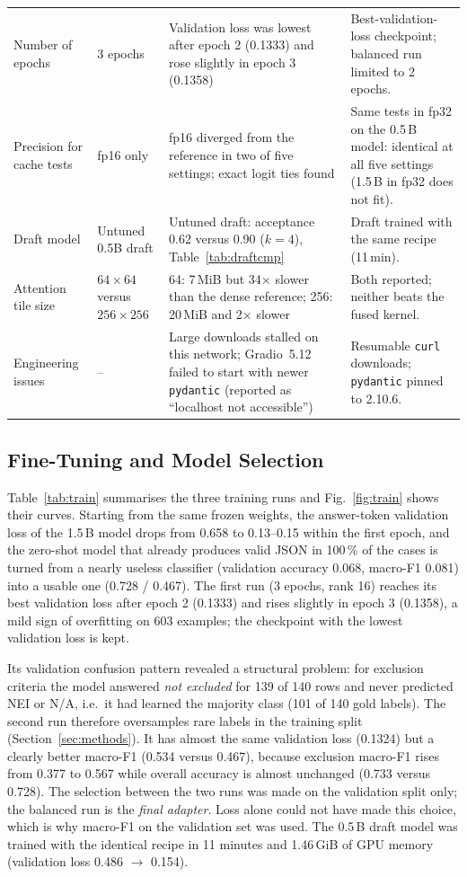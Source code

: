 \begin{table}[t]
\begin{tabular}{p{2.3cm}p{3.5cm}p{4.6cm}p{5.6cm}}
Number of epochs & 3 epochs & Validation loss was lowest after epoch 2 (0.1333) and rose slightly in epoch 3 (0.1358) & Best-validation-loss checkpoint; balanced run limited to 2 epochs. \\
Precision for cache tests & fp16 only & fp16 diverged from the reference in two of five settings; exact logit ties found & Same tests in fp32 on the 0.5\,B model: identical at all five settings (1.5\,B in fp32 does not fit). \\
Draft model & Untuned 0.5B draft & Untuned draft: acceptance 0.62 versus 0.90 ($k=4$), Table~\ref{tab:draftcmp} & Draft trained with the same recipe (11\,min). \\
Attention tile size & $64\times64$ versus $256\times256$ & 64: 7\,MiB but 34$\times$ slower than the dense reference; 256: 20\,MiB and 2$\times$ slower & Both reported; neither beats the fused kernel. \\
Engineering issues & -- & Large downloads stalled on this network; Gradio~5.12 failed to start with newer \texttt{pydantic} (reported as ``localhost not accessible'') & Resumable \texttt{curl} downloads; \texttt{pydantic} pinned to 2.10.6. \\
\hline
\end{tabular}
\end{table}

\subsection{Fine-Tuning and Model Selection}
Table~\ref{tab:train} summarises the three training runs and Fig.~\ref{fig:train} shows their curves. Starting from the same frozen weights, the answer-token validation loss of the 1.5\,B model drops from 0.658 to 0.13--0.15 within the first epoch, and the zero-shot model that already produces valid JSON in 100\,\% of the cases is turned from a nearly useless classifier (validation accuracy 0.068, macro-F1 0.081) into a usable one (0.728 / 0.467). The first run (3 epochs, rank 16) reaches its best validation loss after epoch 2 (0.1333) and rises slightly in epoch 3 (0.1358), a mild sign of overfitting on 603 examples; the checkpoint with the lowest validation loss is kept.

Its validation confusion pattern revealed a structural problem: for exclusion criteria the model answered \emph{not excluded} for 139 of 140 rows and never predicted NEI or N/A, i.e.\ it had learned the majority class (101 of 140 gold labels). The second run therefore oversamples rare labels in the training split (Section~\ref{sec:methods}). It has almost the same validation loss (0.1324) but a clearly better macro-F1 (0.534 versus 0.467), because exclusion macro-F1 rises from 0.377 to 0.567 while overall accuracy is almost unchanged (0.733 versus 0.728). The selection between the two runs was made on the validation split only; the balanced run is the \emph{final adapter}. Loss alone could not have made this choice, which is why macro-F1 on the validation set was used. The 0.5\,B draft model was trained with the identical recipe in 11 minutes and 1.46\,GiB of GPU memory (validation loss 0.486 $\rightarrow$ 0.154).

